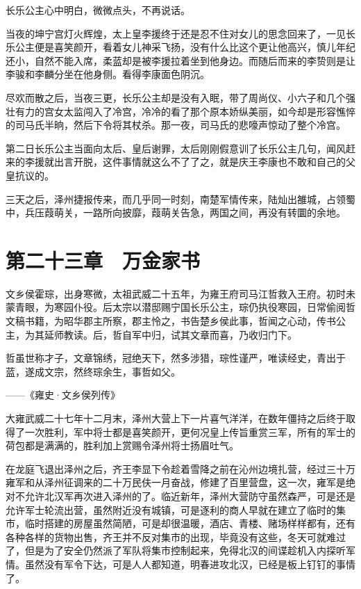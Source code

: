 长乐公主心中明白，微微点头，不再说话。

当夜的坤宁宫灯火辉煌，太上皇李援终于还是忍不住对女儿的思念回来了，一见长乐公主便是喜笑颜开，看着女儿神采飞扬，没有什么比这个更让他高兴，慎儿年纪还小，自然不能入席，柔蓝却是被李援拉着坐到他身边。而随后而来的李贽则是让李骏和李麟分坐在他身侧。看得李康面色阴沉。

尽欢而散之后，当夜三更，长乐公主却是没有入眠，带了周尚仪、小六子和几个强壮有力的宫女太监闯入了冷宫，冷冷的看了那个原本娇纵美丽，如今却是形容憔悴的司马氏半晌，然后下令将其杖杀。那一夜，司马氏的悲嚎声惊动了整个冷宫。

第二日长乐公主当面向太后、皇后谢罪，太后刚刚假意训了长乐公主几句，闻风赶来的李援就出言开脱，这件事情就这么不了了之，就是庆王李康也不敢和自己的父皇抗议的。

三天之后，泽州捷报传来，而几乎同一时刻，南楚军情传来，陆灿出雒城，占领蜀中，兵压葭萌关，一路所向披靡，葭萌关告急，两国之间，再没有转圜的余地。

\chapter{第二十三章　万金家书}

文乡侯霍琮，出身寒微，太祖武威二十五年，为雍王府司马江哲救入王府。初时未蒙青眼，为寒园仆役。后太宗以潜邸赐宁国长乐公主，琮仍执役寒园，日常偷阅哲文稿书籍，为昭华郡主所察，郡主怜之，书告楚乡侯此事，哲闻之心动，传书公主，为其延师教读。后，哲自军中归，试其文章而喜，乃收归门下。

哲虽世称才子，文章锦绣，冠绝天下，然多涉猎，琮性谨严，唯读经史，青出于蓝，遂成文宗，然终琮余生，事哲如父。

——《雍史·文乡侯列传》

大雍武威二十七年十二月末，泽州大营上下一片喜气洋洋，在数年僵持之后终于取得了一次胜利，军中将士都是喜笑颜开，更何况皇上传旨重赏三军，所有的军士的荷包都是满满的，胜利加上赏赐令泽州将士扬眉吐气。

在龙庭飞退出泽州之后，齐王李显下令趁着雪降之前在沁州边境扎营，经过三十万雍军和从泽州征调来的二十万民伕一月奋战，修建了百里营盘，这一次，雍军是绝对不允许北汉军再次进入泽州的了。临近新年，泽州大营防守虽然森严，可是还是允许军士轮流出营，虽然附近没有城镇，可是逐利的商人早就在建立了临时的集市，临时搭建的房屋虽然简陋，可是却很温暖，酒店、青楼、赌场样样都有，还有各种各样的货物出售，齐王并不反对集市的出现，毕竟没有这些，冬天可就难过了，但是为了安全仍然派了军队将集市控制起来，免得北汉的间谍趁机入内探听军情。虽然没有军令下达，可是人人都知道，明春进攻北汉，已经是板上钉钉的事情了。


